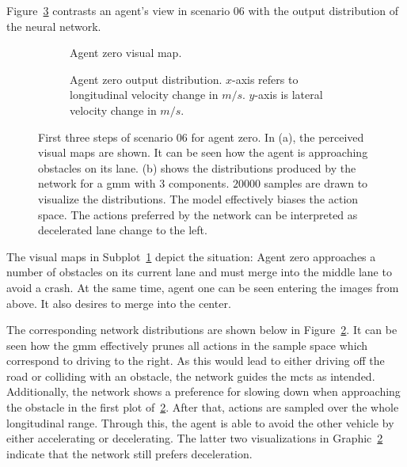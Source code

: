 Figure~\ref{fig:sample_space_pruning_example_06} contrasts an agent's view in scenario 06 with the output distribution of the neural network. 
\begin{figure}
\begin{subfigure}{\textwidth}
  \centering
  \scalebox{0.7}{
  
  }
  \caption{Agent zero visual map.}
  \label{fig:sc06_example_maps}
\end{subfigure}

\begin{subfigure}{\textwidth}
  \centering
  \scalebox{0.7}{
  
  }
  \caption{Agent zero output distribution. $x$-axis refers to longitudinal velocity change in $m/s$. $y$-axis is lateral velocity change in $m/s$.}
  \label{fig:sc06_example_dists}
\end{subfigure}
\caption[Action space pruning for scenario 06]{First three steps of scenario 06 for agent zero. In (a), the perceived visual maps are shown. It can be seen how the agent is approaching obstacles on its lane. (b) shows the distributions produced by the network for a \gls{gmm} with $3$ components. $20000$ samples are drawn to visualize the distributions. The model effectively biases the action space. The actions preferred by the network can be interpreted as decelerated lane change to the left.}
\label{fig:sample_space_pruning_example_06}
\end{figure}
The visual maps in Subplot~\ref{fig:sc06_example_maps} depict the situation: Agent zero approaches a number of obstacles on its current lane and must merge into the middle lane to avoid a crash. At the same time, agent one can be seen entering the images from above. It also desires to merge into the center.

The corresponding network distributions are shown below in Figure~\ref{fig:sc06_example_dists}. It can be seen how the \gls{gmm} effectively prunes all actions in the sample space which correspond to driving to the right. As this would lead to either driving off the road or colliding with an obstacle, the network guides the \gls{mcts} as intended. Additionally, the network shows a preference for slowing down when approaching the obstacle in the first plot of~\ref{fig:sc06_example_dists}. After that, actions are sampled over the whole longitudinal range. Through this, the agent is able to avoid the other vehicle by either accelerating or decelerating. The latter two visualizations in Graphic~\ref{fig:sc06_example_dists} indicate that the network still prefers deceleration.

